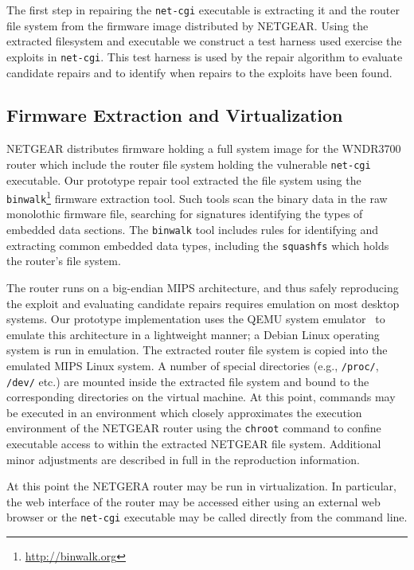\documentclass{sigcomm-alternate}
\begin{document}
The first step in repairing the \texttt{net-cgi} executable is extracting
it and the router file system from the firmware image distributed by
NETGEAR.  Using the extracted filesystem and executable we construct a test
harness used exercise the exploits in \texttt{net-cgi}.  This test harness
is used by the repair algorithm to evaluate candidate repairs and to
identify when repairs to the exploits have been found.

\subsection{Firmware Extraction and Virtualization}
\label{sec-3-1}
NETGEAR distributes firmware holding a full system image for the
WNDR3700 router which include the router file system holding the
vulnerable \texttt{net-cgi} executable. Our prototype repair tool
extracted the file system using the 
\texttt{binwalk}\footnote{\url{http://binwalk.org}} firmware extraction
tool. Such tools scan the binary data in the raw monolothic firmware file,
searching for signatures
identifying the types of embedded data sections.  The \texttt{binwalk} tool
includes rules for identifying and extracting common embedded data
types, including the {\tt squashfs}\cite{lougher2006squashfs} which
holds the router's file system.

The router runs on a big-endian MIPS architecture, and thus safely
reproducing the exploit and evaluating candidate repairs requires emulation
on most desktop systems. Our prototype implementation uses the QEMU system
emulator~\cite{bellard2005qemu} to emulate this architecture in a
lightweight manner; a Debian Linux operating system is run in emulation.
The extracted router file system is copied into the emulated MIPS Linux
system.  A number of special directories (e.g., \texttt{/proc/},
\texttt{/dev/} etc.) are mounted inside the extracted file system and bound
to the corresponding directories on the virtual machine.  At this point,
commands may be executed in an environment which closely approximates the
execution environment of the NETGEAR router using the \texttt{chroot}
command to confine executable access to within the extracted NETGEAR file
system. Additional minor adjustments are described in full in the
reproduction information.

At this point the NETGERA router may be run in virtualization.  In
particular, the web interface of the router may be accessed either using an
external web browser or the \texttt{net-cgi} executable may be called
directly from the command line.
\end{document}
